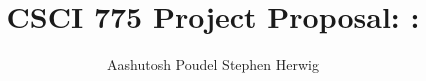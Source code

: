 \documentclass[11pt]{article}
\title{CSCI 775 Project Proposal: \Name:}
\author{Aashutosh Poudel \hspace{4em} Stephen Herwig}
\date{}
\begin{document}
\maketitle

\begin{abstract}

\end{abstract}







\end{document}
